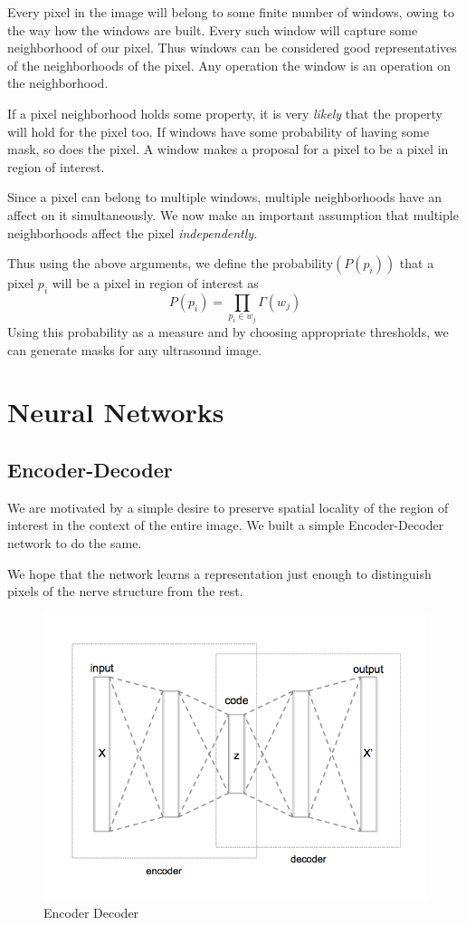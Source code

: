 \documentclass[12pt, a4paper]{article}
\begin{document}
Every pixel in the image will belong to some finite number of windows, owing to the way how the windows are built. Every such window will capture some neighborhood of our pixel. Thus windows can be considered good representatives of the neighborhoods of the pixel. Any operation the window is an operation on the neighborhood. 

If a pixel neighborhood holds some property, it is very \emph{likely} that the property will hold for the pixel too. If windows have some probability of having some mask, so does the pixel. A window makes a proposal for a pixel to be a pixel in region of interest.

Since a pixel can belong to multiple windows, multiple neighborhoods have an affect on it simultaneously. We now make an important assumption that multiple neighborhoods affect the pixel \emph{independently}.

Thus using the above arguments, we define the probability$(P(p_i))$ that a pixel $p_i$ will be a pixel in region of interest as
$$ P(p_i) = \prod\limits_{p_i \in w_j} \Gamma(w_j) $$
Using this probability as a measure and by choosing appropriate thresholds, we can generate masks for any ultrasound image.
\newpage
\section{Neural Networks}
\subsection{Encoder-Decoder}
We are motivated by a simple desire to preserve spatial locality of the region of interest in the context of the entire image. We built a simple Encoder-Decoder network to do the same. 

We hope that the network learns a representation just enough to distinguish pixels of the nerve structure from the rest. 

\begin{figure}[h] 
  \includegraphics[width=\linewidth]{Autoencoder_structure.png}
  \caption[ ]{Encoder Decoder\footnotemark}
  \label{fig:autoencoder}
\end{figure}
\end{document}
